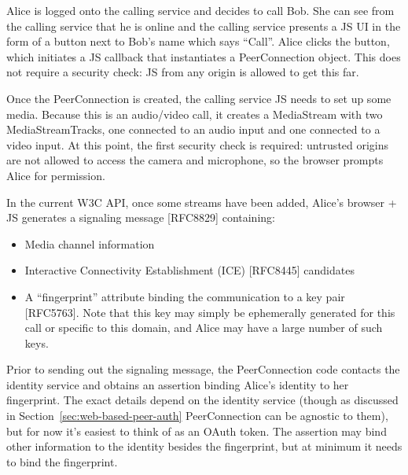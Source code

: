 \documentclass{article}
\begin{document}
Alice is logged onto the calling service and decides to call Bob. She
can see from the calling service that he is online and the calling
service presents a JS UI in the form of a button next to Bob's name
which says ``Call''.  Alice clicks the button, which initiates a JS
callback that instantiates a PeerConnection object.  This does not
require a security check: JS from any origin is allowed to get this
far.

Once the PeerConnection is created, the calling service JS needs to
set up some media.  Because this is an audio/video call, it creates a
MediaStream with two MediaStreamTracks, one connected to an audio
input and one connected to a video input.  At this point, the first
security check is required: untrusted origins are not allowed to
access the camera and microphone, so the browser prompts Alice for
permission.

In the current W3C API, once some streams have been added, Alice's
browser + JS generates a signaling message [RFC8829] containing:

\begin{itemize}
\item Media channel information

\item Interactive Connectivity Establishment (ICE) [RFC8445] candidates

\item A ``fingerprint'' attribute binding the communication to a key pair
  [RFC5763].  Note that this key may simply be ephemerally generated
  for this call or specific to this domain, and Alice may have a
  large number of such keys.
\end{itemize}

Prior to sending out the signaling message, the PeerConnection code
contacts the identity service and obtains an assertion binding
Alice's identity to her fingerprint.  The exact details depend on the
identity service (though as discussed in Section~\ref{sec:web-based-peer-auth} PeerConnection can
be agnostic to them), but for now it's easiest to think of as an
OAuth token.  The assertion may bind other information to the
identity besides the fingerprint, but at minimum it needs to bind the
fingerprint.
\end{document}
